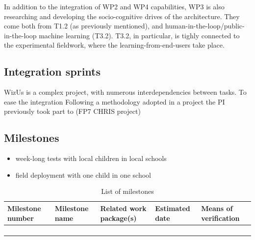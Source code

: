 \documentclass[11pt,a4paper]{report}
\newcommand{\project}{WizUs\xspace}
\begin{document}
In addition to the integration of WP2 and WP4 capabilities, WP3 is also
researching and developing the socio-cognitive drives of the architecture. They
come both from T1.2 (as previously mentioned), and
human-in-the-loop/public-in-the-loop machine learning (T3.2). T3.2, in
particular, is tighly connected to the experimental fieldwork, where the
learning-from-end-users take place.

\subsection{Integration sprints}

\project is a complex project, with numerous interdependencies between tasks.
To ease the integration
Following a methodology adopted in a project the PI previously took part to (FP7
CHRIS project)


\subsection{Milestones}\label{milestones}

\begin{itemize}

\item   week-long tests with local children in local schools
\item   field deployment with one child in one school
\end{itemize}

\begin{table}[!htbp]
\caption{List of milestones}
\centering
\begin{tabular}{@{}lllll@{}}
\toprule
\textbf{Milestone number} & \textbf{Milestone name} & \textbf{Related work package(s)} & \textbf{Estimated date} & \textbf{Means of verification} \\ \midrule
                          &                         &                                  &                         &                                \\
                          &                         &                                  &                         &                                \\
                          &                         &                                  &                         &                                \\
                          &                         &                                  &                         &                                \\ \bottomrule
\end{tabular}
\end{table}
\end{document}
